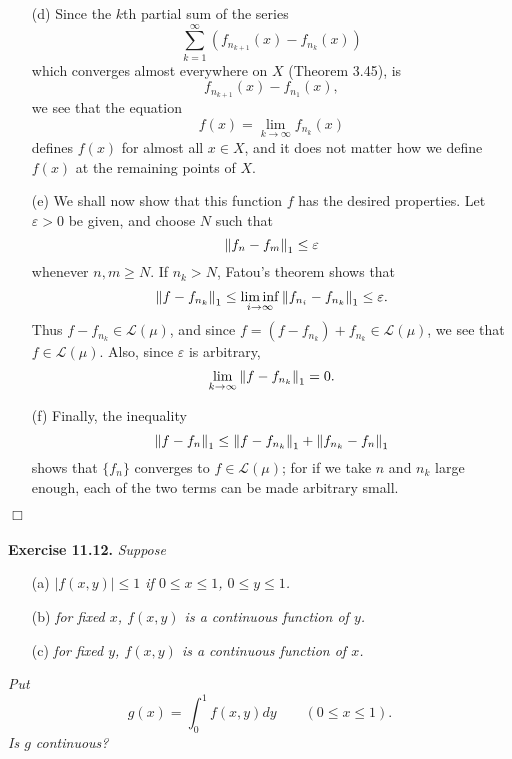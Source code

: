 \documentclass{article}
\begin{document}
\begin{enumerate}
\begin{enumerate}
  \item[(d)]
    Since the $k$th partial sum of the series
    \[
      \sum_{k=1}^{\infty} (f_{n_{k+1}}(x) - f_{n_{k}}(x))
    \]
    which converges almost everywhere on $X$ (Theorem 3.45), is
    \[
      f_{n_{k+1}}(x) - f_{n_{1}}(x),
    \]
    we see that the equation
    \[
      f(x) = \lim_{k \to \infty} f_{n_k}(x)
    \]
    defines $f(x)$ for almost all $x \in X$,
    and it does not matter how we define $f(x)$ at the remaining points of $X$.

  \item[(e)]
    We shall now show that this function $f$ has the desired properties.
    Let $\varepsilon > 0$ be given, and choose $N$ such that
    \[
      \norm{ f_n-f_m }_1 \leq \varepsilon
    \]
    whenever $n, m \geq N$.
    If $n_k > N$, Fatou's theorem shows that
    \[
      \norm{ f-f_{n_k} }_1
      \leq \liminf_{i \to \infty} \norm{ f_{n_i}-f_{n_k} }_1
      \leq \varepsilon.
    \]
    Thus $f-f_{n_k} \in \mathscr{L}(\mu)$,
    and since $f = (f-f_{n_k}) + f_{n_k} \in \mathscr{L}(\mu)$,
    we see that $f \in \mathscr{L}(\mu)$.
    Also, since $\varepsilon$ is arbitrary,
    \[
      \lim_{k \to \infty} \norm{f-f_{n_k}}_1 = 0.
    \]

  \item[(f)]
    Finally, the inequality
    \[
      \norm{f-f_n}_1 \leq \norm{f-f_{n_k}}_1 + \norm{f_{n_k}-f_n}_1
    \]
    shows that $\{f_n\}$ converges to $f \in \mathscr{L}(\mu)$;
    for if we take $n$ and $n_k$ large enough,
    each of the two terms can be made arbitrary small.
  \end{enumerate}
\end{enumerate}
$\Box$ \\\\






\textbf{Exercise 11.12.}
\emph{Suppose}
\begin{enumerate}
\item[(a)]
  \emph{$|f(x,y)| \leq 1$ if $0 \leq x \leq 1$, $0 \leq y \leq 1$.}

\item[(b)]
  \emph{for fixed $x$, $f(x,y)$ is a continuous function of $y$.}

\item[(c)]
  \emph{for fixed $y$, $f(x,y)$ is a continuous function of $x$.}
\end{enumerate}
\emph{Put
\[
  g(x) = \int_{0}^{1} f(x,y) dy
  \qquad
  (0 \leq x \leq 1).
\]
Is $g$ continuous?} \\
\end{document}
